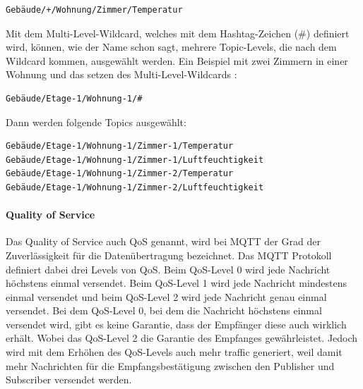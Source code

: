 \begin{verbatim}
Gebäude/+/Wohnung/Zimmer/Temperatur
\end{verbatim}

Mit dem Multi-Level-Wildcard, welches mit dem Hashtag-Zeichen (\#) definiert wird, können, wie der Name schon sagt, mehrere Topic-Levels, die nach dem Wildcard kommen, ausgewählt werden. Ein Beispiel mit zwei Zimmern in einer Wohnung und das setzen des Multi-Level-Wildcards \cite{Mangel2019}:

\begin{verbatim}
Gebäude/Etage-1/Wohnung-1/#
\end{verbatim}
Dann werden folgende Topics ausgewählt:
\begin{verbatim}
Gebäude/Etage-1/Wohnung-1/Zimmer-1/Temperatur
Gebäude/Etage-1/Wohnung-1/Zimmer-1/Luftfeuchtigkeit
Gebäude/Etage-1/Wohnung-1/Zimmer-2/Temperatur
Gebäude/Etage-1/Wohnung-1/Zimmer-2/Luftfeuchtigkeit
\end{verbatim}

\paragraph{Quality of Service}

Das Quality of Service auch QoS genannt, wird bei MQTT der Grad der Zuverlässigkeit für die Datenübertragung bezeichnet. Das MQTT Protokoll definiert dabei drei Levels von QoS. Beim QoS-Level 0 wird jede Nachricht höchstens einmal versendet. Beim QoS-Level 1 wird jede Nachricht mindestens einmal versendet und beim QoS-Level 2 wird jede Nachricht genau einmal versendet. Bei dem QoS-Level 0, bei dem die Nachricht höchstens einmal versendet wird, gibt es keine Garantie, dass der Empfänger diese auch wirklich erhält. Wobei das QoS-Level 2 die Garantie des Empfanges gewährleistet. Jedoch wird mit dem Erhöhen des QoS-Levels auch mehr traffic generiert, weil damit mehr Nachrichten für die Empfangsbestätigung zwischen den Publisher und Subscriber versendet werden.   

